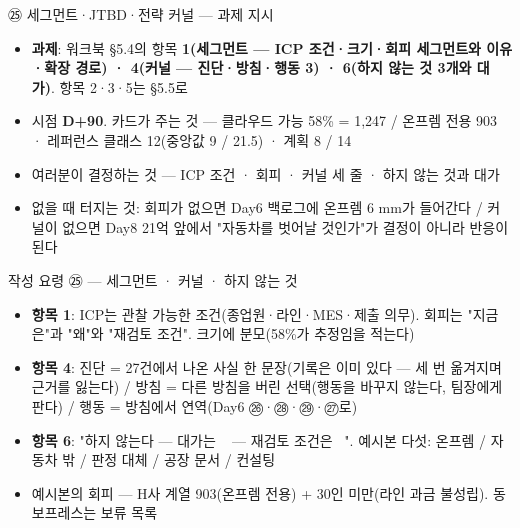 \begin{frame}{㉕ 세그먼트·JTBD·전략 커널 — 과제 지시}
\begin{itemize}
\item \textbf{과제}: 워크북 §5.4의 항목 \textbf{1(세그먼트 — ICP 조건·크기·회피 세그먼트와 이유·확장 경로) · 4(커널 — 진단·방침·행동 3) · 6(하지 않는 것 3개와 대가)}. 항목 2·3·5는 §5.5로
\item 시점 \textbf{D+90}. 카드가 주는 것 — 클라우드 가능 58\% = 1,247 / 온프렘 전용 903 · 레퍼런스 클래스 12(중앙값 9 / 21.5) · 계획 8 / 14
\item 여러분이 결정하는 것 — ICP 조건 · 회피 · 커널 세 줄 · 하지 않는 것과 대가
\item 없을 때 터지는 것: 회피가 없으면 Day6 백로그에 온프렘 6 mm가 들어간다 / 커널이 없으면 Day8 21억 앞에서 "자동차를 벗어날 것인가"가 결정이 아니라 반응이 된다
\end{itemize}
\end{frame}

\begin{frame}{작성 요령 ㉕ — 세그먼트 · 커널 · 하지 않는 것}
\begin{itemize}
\item \textbf{항목 1}: ICP는 관찰 가능한 조건(종업원·라인·MES·제출 의무). 회피는 "지금은"과 "왜"와 "재검토 조건". 크기에 분모(58\%가 추정임을 적는다)
\item \textbf{항목 4}: 진단 = 27건에서 나온 사실 한 문장(기록은 이미 있다 — 세 번 옮겨지며 근거를 잃는다) / 방침 = 다른 방침을 버린 선택(행동을 바꾸지 않는다, 팀장에게 판다) / 행동 = 방침에서 연역(Day6 ㉖·㉘·㉙·㉗로)
\item \textbf{항목 6}: "하지 않는다 — 대가는 ~ — 재검토 조건은 ~". 예시본 다섯: 온프렘 / 자동차 밖 / 판정 대체 / 공장 문서 / 컨설팅
\item 예시본의 회피 — H사 계열 903(온프렘 전용) + 30인 미만(라인 과금 불성립). 동보프레스는 보류 목록
\end{itemize}
\end{frame}

